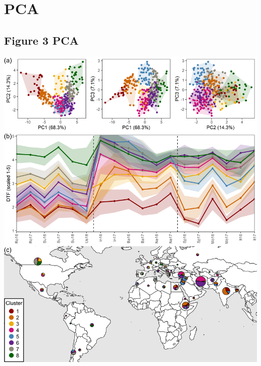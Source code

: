 \documentclass[
]{article}
\begin{document}
\hypertarget{pca}{%
\section{PCA}\label{pca}}

\hypertarget{figure-3-pca}{%
\subsection{Figure 3 PCA}\label{figure-3-pca}}

\includegraphics{Figure_03.png}
\end{document}
